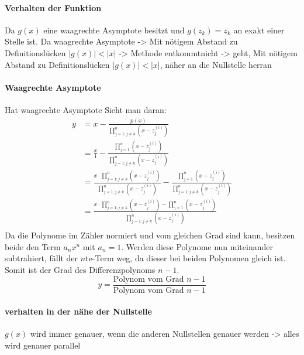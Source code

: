 \documentclass[12pt]{article}
\begin{document}
\paragraph{Verhalten der Funktion}
Da $g(x)$ eine waagrechte Asymptote besitzt und $g(z_k) = z_k$ an exakt einer Stelle ist.
Da waagrechte Asymptote -> Mit nötigem Abstand zu Definitionslücken $|g(x)|<|x|$
-> Methode \glqq entkommt\grqq\space nicht
-> geht, Mit nötigem Abstand zu Definitionslücken $|g(x)|<|x|$, näher an die Nullstelle herran

\paragraph{Waagrechte Asymptote}
Hat waagrechte Asymptote
Sieht man daran:
\begin{align*}
    y &= x - \frac{p(x)}{\prod_{j=1;j\neq k}^{n} (x-z_j^{(i)})} \\
    &= \frac{x}{1} - \frac{\prod_{j=1}^{n} (x-z_j^{(i)})}{\prod_{j=1;j\neq k}^{n} (x-z_j^{(i)})} \\
    &= \frac{x \cdot \prod_{j=1;j\neq k}^{n} (x-z_j^{(i)})}{\prod_{j=1;j\neq k}^{n} (x-z_j^{(i)})} - \frac{\prod_{j=1}^{n} (x-z_j^{(i)})}{\prod_{j=1;j\neq k}^{n} (x-z_j^{(i)})} \\
    &= \frac{x \cdot \prod_{j=1;j\neq k}^{n} (x-z_j^{(i)}) - \prod_{j=1}^{n} (x-z_j^{(i)})}{\prod_{j=1;j\neq k}^{n} (x-z_j^{(i)})} \\
\end{align*}
Da die Polynome im Zähler normiert und vom gleichen Grad sind kann, besitzen beide den Term $a_nx^n$ mit $a_n = 1$. Werden diese Polynome nun miteinander subtrahiert, fällt der $n$te-Term weg, da dieser bei beiden Polynomen gleich ist. Somit ist der Grad des Differenzpolynoms $n-1$. \\
\begin{equation*}
    y = \frac{\text{Polynom vom Grad }n-1}{\text{Polynom vom Grad }n-1}
\end{equation*}
\paragraph{verhalten in der nähe der Nullstelle}
$g(x)$ wird immer genauer, wenn die anderen Nullstellen genauer werden
-> alles wird genauer parallel
\end{document}
